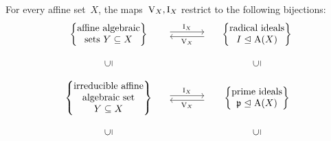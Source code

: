 \begin{theorem}
  \label{nullstellensatz 3}
  For every affine set~$X$, the maps~$\operatorname{V}_X, \operatorname{I}_X$ restrict to the following bijections:
  \[
    \begin{matrix}
        \left\{
          \begin{tabular}{@{}c@{}}
              affine  algebraic \\
              sets~$Y \subseteq X$
          \end{tabular}
        \right\}
      & \begin{tikzcd}[column sep = large]
            {}
            \arrow[shift left]{r}{\videal_X}
          & {}
            \arrow[shift left]{l}{\vset_X}
        \end{tikzcd}
      & \left\{
          \begin{tabular}{@{}c@{}}
            radical ideals \\
            $I \idealleq \coord(X)$
          \end{tabular}
        \right\}
      \\
        {}
      & {}
      & {}
      \\
        \rotatebox[origin=c]{90}{$\subseteq$}
      & {}
      & \rotatebox[origin=c]{90}{$\subseteq$}
      \\
        {}
      & {}
      & {}
      \\
        \left\{
          \begin{tabular}{@{}c@{}}
              irreducible affine \\
              algebraic set \\
              $Y \subseteq X$
          \end{tabular}
        \right\}
      & \begin{tikzcd}[column sep = large]
            {}
            \arrow[shift left]{r}{\videal_X}
          & {}
            \arrow[shift left]{l}{\vset_X}
        \end{tikzcd}
      & \left\{
          \begin{tabular}{@{}c@{}}
            prime ideals \\
            $\mf{p} \idealleq \coord(X)$
          \end{tabular}
        \right\}
      \\
        {}
      & {}
      & {}
      \\
        \rotatebox[origin=c]{90}{$\subseteq$}
      & {}
      & \rotatebox[origin=c]{90}{$\subseteq$}
      \\

\end{matrix}\]
\end{theorem}

